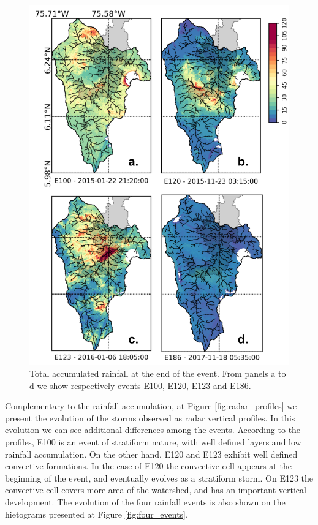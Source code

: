 \documentclass[preprint,12pt]{elsarticle}
\begin{document}
\begin{figure}[!h]
    \centering
    \includegraphics[width=14cm]{Figuras/Rainfall_accumulation.png}
    \caption{Total accumulated rainfall at the end of the event.  From panels a to d we show respectively events E100, E120, E123 and E186.}
    \label{fig:rainfall_acum}
\end{figure}
Complementary to the rainfall accumulation, at Figure \ref{fig:radar_profiles} we present the evolution of the storms observed as radar vertical profiles. In this evolution we can see additional differences among the events.  According to the profiles, E100 is an event of stratiform nature, with well defined layers and low rainfall accumulation.  On the other hand, E120 and E123 exhibit well defined convective formations.  In the case of E120 the convective cell appears at the beginning of the event, and eventually evolves as a stratiform storm.  On E123 the convective cell covers more area of the watershed, and has an important vertical development.  The evolution of the four rainfall events is also shown on the hietograms presented at Figure \ref{fig:four_events}.  
\end{document}
